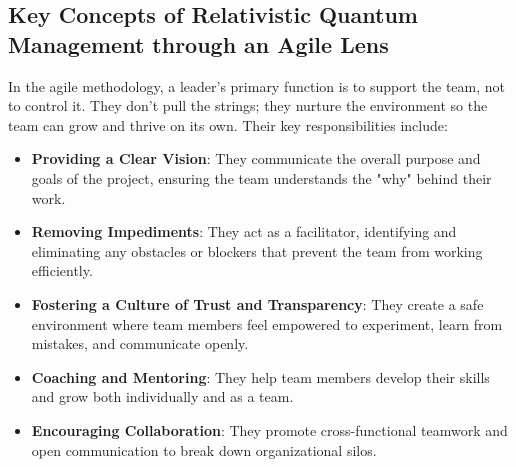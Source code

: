 \documentclass{article}
\begin{document}
\subsection{Key Concepts of Relativistic Quantum Management through an Agile Lens}
In the agile methodology, a leader's primary function is to support the team, not to control it. They don't pull the strings; they nurture the environment so the team can grow and thrive on its own. Their key responsibilities include:
\begin{itemize}
\item \textbf{Providing a Clear Vision}: They communicate the overall purpose and goals of the project, ensuring the team understands the "why" behind their work.
\item \textbf{Removing Impediments}: They act as a facilitator, identifying and eliminating any obstacles or blockers that prevent the team from working efficiently.
\item \textbf{Fostering a Culture of Trust and Transparency}: They create a safe environment where team members feel empowered to experiment, learn from mistakes, and communicate openly.
\item \textbf{Coaching and Mentoring}: They help team members develop their skills and grow both individually and as a team.
\item \textbf{Encouraging Collaboration}: They promote cross-functional teamwork and open communication to break down organizational silos.
\end{itemize}
\end{document}

